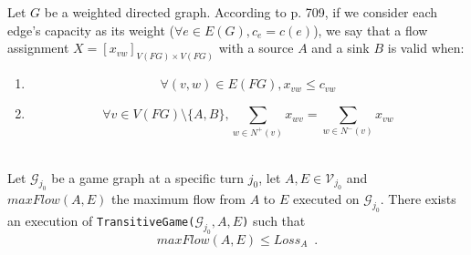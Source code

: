 \documentclass[11pt]{llncs}
\begin{document}
    Let $G$ be a weighted directed graph. According to \cite{clrs} p. 709, if we consider each edge's capacity as its weight
    ($\forall e \in E(G), c_e = c(e)$), we say that a flow assignment $X = [x_{vw}]_{V(FG) \times V(FG)}$ with a source $A$
    and a sink $B$ is valid when:
    \begin{enumerate}
       \item \begin{equation}
             \label{flow1}
                \forall (v, w) \in E(FG), x_{vw} \leq c_{vw}
             \end{equation}
       \item \begin{equation}
             \label{flow2}
                \forall v \in V(FG) \setminus \{A,B\},
                \sum\limits_{w \in N^{+}(v)}x_{wv} = \sum\limits_{w \in N^{-}(v)}x_{vw}
             \end{equation}
    \end{enumerate}
    \begin{lemma} \ \\
       \label{maxflowgame}
       Let $\mathcal{G}_{j_0}$ be a game graph at a specific turn $j_0$, let $A, E \in \mathcal{V}_{j_0}$ and
       $maxFlow\left(A, E\right)$ the maximum flow from $A$ to $E$ executed on $\mathcal{G}_{j_0}$. There exists an execution
       of \texttt{TransitiveGame(}$\mathcal{G}_{j_0}, A, E$\texttt{)} such that
       \begin{equation}
          maxFlow\left(A, E\right) \leq Loss_A \enspace.
       \end{equation}
    \end{lemma}
\end{document}
